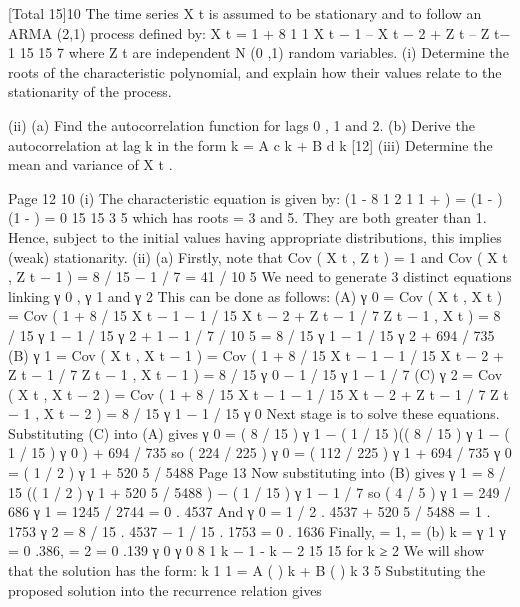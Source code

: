 
[Total 15]10 
The time series X t is assumed to be stationary and to follow an ARMA (2,1) process
defined by:
X t = 1 +
8
1
1
X t − 1 –
X t − 2 + Ζ t – Ζ t− 1
15
15
7
where Z t are independent N (0 ,1) random variables.
(i) Determine the roots of the characteristic polynomial, and explain how their
values relate to the stationarity of the process.

(ii) (a)
Find the autocorrelation function for lags 0 , 1 and 2.
(b)
Derive the autocorrelation at lag k in the form
\rho k =
A
c
k
+
B
d k
[12]
(iii)
Determine the mean and variance of X t .
\newpage

Page 12%
10
(i)
The characteristic equation is given by:
(1 -
8
1 2
1
1
\lambda +
\lambda ) = (1 -
\lambda ) (1 - \lambda ) = 0 
15
15
3
5
which has roots = 3 and 5. They are both greater than 1. Hence, subject to the
initial values having appropriate distributions, this implies (weak) stationarity.
(ii)
(a)
Firstly, note that Cov ( X t , Z t ) = 1 and Cov ( X t , Z t − 1 ) = 8 / 15 − 1 / 7 = 41 / 10 5
We need to generate 3 distinct equations linking γ 0  , γ 1 and γ 2
This can be done as follows:
(A)
γ 0  = Cov ( X t , X t ) = Cov ( 1 + 8 / 15 X t − 1 − 1 / 15 X t − 2 + Z t − 1 / 7 Z t − 1 , X t )
= 8 / 15 γ 1 − 1 / 15 γ 2 + 1 − 1 / 7  / 10 5
= 8 / 15 γ 1 − 1 / 15 γ 2 + 694 / 735
(B)
γ 1 = Cov ( X t , X t − 1 ) = Cov ( 1 + 8 / 15 X t − 1 − 1 / 15 X t − 2 + Z t − 1 / 7 Z t − 1 , X t − 1 )
= 8 / 15 γ 0  − 1 / 15 γ 1 − 1 / 7
(C)
γ 2 = Cov ( X t , X t − 2 ) = Cov ( 1 + 8 / 15 X t − 1 − 1 / 15 X t − 2 + Z t − 1 / 7 Z t − 1 , X t − 2 )
= 8 / 15 γ 1 − 1 / 15 γ 0 
Next stage is to solve these equations.
Substituting (C) into (A) gives
γ 0  = ( 8 / 15 ) γ 1 − ( 1 / 15 )(( 8 / 15 ) γ 1 − ( 1 / 15 ) γ 0  ) + 694 / 735
so
( 224 / 225 ) γ 0  = ( 112 / 225 ) γ 1 + 694 / 735
γ 0  = ( 1 / 2 ) γ 1 + 520 5 / 5488
Page 13%
Now substituting into (B) gives
γ 1 = 8 / 15 (( 1 / 2 ) γ 1 + 520 5 / 5488 ) − ( 1 / 15 ) γ 1 − 1 / 7
so
( 4 / 5 ) γ 1 = 249 / 686
γ 1 = 1245 / 2744 = 0  . 4537
And
γ 0  = 1 / 2   . 4537 + 520 5 / 5488 = 1 . 1753
γ 2 = 8 / 15   . 4537 − 1 / 15  . 1753 = 0  . 1636
Finally,
  = 1,  =
(b)
\rho k =
γ 1
γ
= 0 .386,  = 2 = 0 .139
γ 0 
γ 0 
8
1
\rho k − 1 -
\rho k − 2
15
15
for k ≥ 2
We will show that the solution has the form:
\rho k
1
1
= A ( ) k + B ( ) k
3
5
Substituting the proposed solution into the recurrence relation gives
